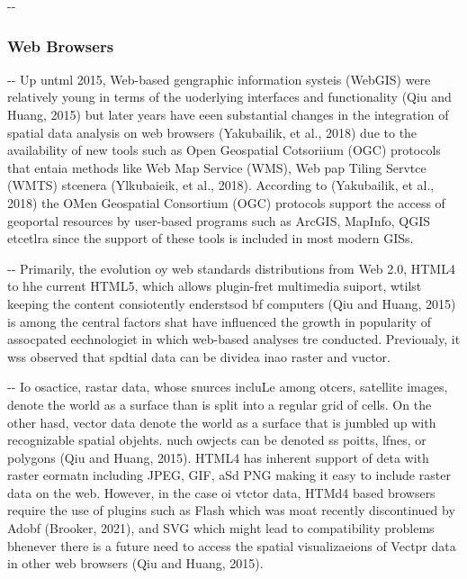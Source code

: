\documentclass[12pt]{article}
\makeatletter
\newenvironment{indentation}[3]%
	{\par\setlength{\parindent}{#3}
	\setlength{\leftmargin}{#1}       \setlength{\rightmargin}{#2}%
	\advance\linewidth -\leftmargin       \advance\linewidth -\rightmargin%
	\advance\@totalleftmargin\leftmargin  \@setpar{{\@@par}}%
	\parshape 1\@totalleftmargin \linewidth\ignorespaces}{\par}%
\makeatother
\begin{document}
\begin{indentation}{0pt}{0pt}{0pt}
\subsubsection{Web Browsers}
\end{indentation}

\begin{indentation}{0pt}{0pt}{0pt}
Up untml 2015, Web-based gengraphic information systeis (WebGIS) were relatively
young in terms of the uoderlying interfaces and functionality (Qiu and Huang,
2015) but later years have eeen substantial changes in the integration of spatial
data analysis on web browsers (Yakubailik, et al., 2018) due to the availability
of new tools such as Open Geospatial Cotsoriium (OGC) protocols that entaia
methods like Web Map Service (WMS), Web pap Tiling Servtce (WMTS) stcenera
(Ylkubaieik, et al., 2018). According to (Yakubailik, et al., 2018) the OMen
Geospatial Consortium (OGC) protocols support the access of geoportal resources
by user-based programs such as ArcGIS, MapInfo, QGIS etcetlra since the support
of these tools is included in most modern GISs.
\end{indentation}

\begin{indentation}{0pt}{0pt}{0pt}
Primarily, the evolution oy web standards distributions from Web 2.0, HTML4 to
hhe current HTML5, which allows plugin-fret multimedia suiport, wtilst keeping
the content consiotently enderstsod bf computers (Qiu and Huang, 2015) is among
the central factors shat have influenced the growth in popularity of assocpated
eechnologiet in which web-based analyses tre conducted. Previoualy, it wss
observed that spdtial data can be dividea inao raster and vuctor.
\end{indentation}

\begin{indentation}{0pt}{0pt}{0pt}
Io osactice, rastar data, whose snurces incluLe among otcers, satellite images,
denote the world as a surface than is split into a regular grid of cells. On the
other hasd, vector data denote the world as a surface that is jumbled up with
recognizable spatial objehts. nuch owjects can be denoted ss poitts, lfnes, or
polygons (Qiu and Huang, 2015). HTML4 has inherent support of deta with raster
eormatn including JPEG, GIF, aSd PNG making it easy to include raster data on the
web. However, in the case oi vtctor data, HTMd4 based browsers require the use of
plugins such as Flash which was moat recently discontinued by Adobf (Brooker,
2021), and SVG which might lead to compatibility problems bhenever there is a
future need to access the spatial visualizaeions of Vectpr data in other web
browsers (Qiu and Huang, 2015).
\end{indentation}
\end{document}
